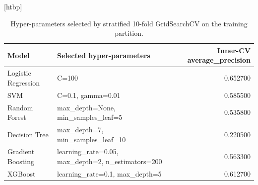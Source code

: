 \begin{table}
\small[htbp]
\caption{Hyper-parameters selected by stratified 10-fold GridSearchCV on the training partition.}
\label{tab:S04_hyperparameters}
\begin{tabular}{llr}
\toprule
Model & Selected hyper-parameters & Inner-CV average\_precision \\
\midrule
Logistic Regression & C=100 & 0.652700 \\
SVM & C=0.1, gamma=0.01 & 0.585500 \\
Random Forest & max\_depth=None, min\_samples\_leaf=5 & 0.535800 \\
Decision Tree & max\_depth=7, min\_samples\_leaf=10 & 0.220500 \\
Gradient Boosting & learning\_rate=0.05, max\_depth=2, n\_estimators=200 & 0.563300 \\
XGBoost & learning\_rate=0.1, max\_depth=5 & 0.612700 \\
\bottomrule
\end{tabular}
\end{table}
